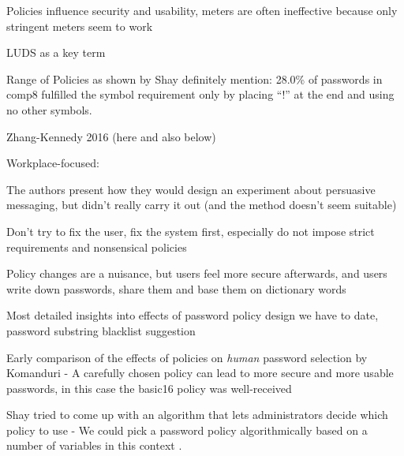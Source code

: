 	
	Policies influence security and usability, meters are often ineffective because only stringent meters seem to work \cite{Ur2012HelpingUsersCreateBetterPasswords}
	
	LUDS as a key term \cite{Wheeler2016zxcvbn}
	
		
	Range of Policies as shown by Shay \cite{Shay2014CanLongPasswordsBeSecureAndUsable}
	definitely mention: 28.0\% of passwords in comp8 fulfilled the symbol requirement only by placing ``!'' at the end and using no other symbols. 
	
	Zhang-Kennedy 2016 (here and also below) \cite{ZhangKennedy2016RevisitingPasswordRules}
	
	
	Workplace-focused: 
	
	
	The authors present how they would design an experiment about persuasive messaging, but didn't really carry it out (and the method doesn't seem suitable) \cite{Zakaria2013DesigningEffectiveSecurityMessages}
	
	Don't try to fix the user, fix the system first, especially do not impose strict requirements and nonsensical policies \cite{Florencio2014AdministratorsGuide} 
	
	Policy changes are a nuisance, but users feel more secure afterwards, and users write down passwords, share them and base them on dictionary words 	\cite{Shay2010EncounteringPasswordRequirements}
	
	Most detailed insights into effects of password policy design we have to date, password substring blacklist suggestion \cite{Shay2016DesigningPasswordPolicies}
	
	\cite{Weir2010MetricsPolicies}
	
	\cite{Wang2015EmperorsPolicies}
	
	
	\cite{Florencio2010WhereDoPoliciesComeFrom}
	
	\cite{Horsch2016PasswordPolicyMarkup}
	
	\cite{Chiasson2015QuantifyingExpiration}
	\cite{Blocki2013OptimizingPasswordPolicies}
	
	Early comparison of the effects of policies on \textit{human} password selection by Komanduri \etal - A carefully chosen policy can lead to more secure and more usable passwords, in this case the basic16 policy was well-received \cite{Komanduri2011OfPasswordsAndPeople}
	
	
	Shay tried to come up with an algorithm that lets administrators decide which policy to use - We could pick a password policy algorithmically based on a number of variables in this context \cite{Shay2009PolicySimulation}.
	
